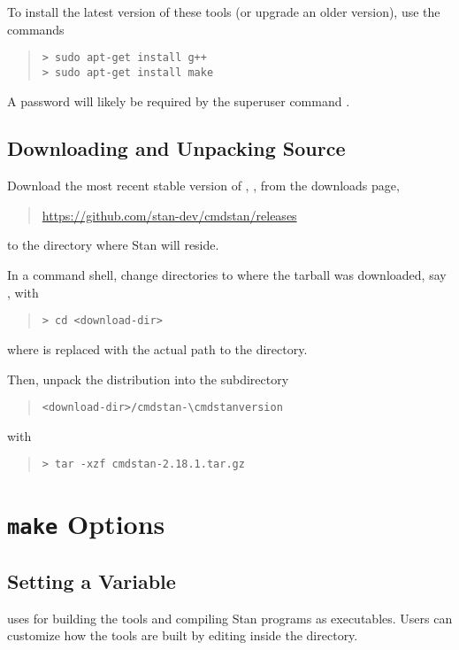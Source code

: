 To install the latest version of these
tools (or upgrade an older version), use the commands
%
\begin{quote}
\begin{Verbatim}[fontshape=sl,fontsize=\small]
> sudo apt-get install g++
> sudo apt-get install make
\end{Verbatim}
\end{quote}
%
A password will likely be required by the superuser command .


\subsection{Downloading and Unpacking \CmdStan Source}

Download the most recent stable version of \CmdStan,
, from the \CmdStan downloads page,
%
\begin{quote}
\url{https://github.com/stan-dev/cmdstan/releases}
\end{quote}
%
to the directory where Stan will reside.

In a command shell, change directories to where the tarball was
downloaded, say , with
%
\begin{quote}
\begin{Verbatim}[fontshape=sl,fontsize=\small]
> cd <download-dir>
\end{Verbatim}
\end{quote}
%
where  is replaced with the actual path to the directory.

Then, unpack the distribution into the subdirectory
\begin{quote}
\nolinkurl{<download-dir>/cmdstan-\cmdstanversion}
\end{quote}
%
with
%
\begin{quote}
\begin{Verbatim}[fontshape=sl,fontsize=\small]
> tar -xzf cmdstan-2.18.1.tar.gz
\end{Verbatim}
\end{quote}


\section{{\tt make} Options}\label{make-options.appendix}

\subsection{Setting a Variable}
\CmdStan uses  for building the \CmdStan tools and
compiling Stan programs as executables. Users can customize how the
tools are built by editing  inside the
 directory.


